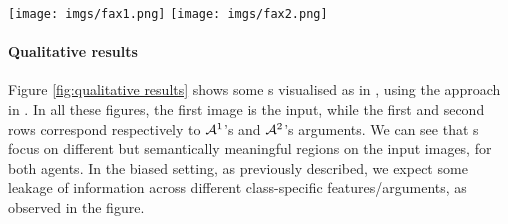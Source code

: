 \begin{figure*}
    \hfill
    \texttt{[image: imgs/fax1.png]} \hfill
    \texttt{[image: imgs/fax2.png]} \hfill
    \caption{Arguments %
    in \FAXIC s (%
    the proponent starts with the top left argument, the opponent follows with the argument below it, etc.), for classifiers trained on  FFHQ (left column) and AFHQ (right column)%
    , on fair (top row) and biased (bottom row) %
    settings. 
    }
    \label{fig:qualitative results}
    \vspace{-5pt}
\end{figure*}

\paragraph{Qualitative results}
Figure \ref{fig:qualitative results} shows some \FAXIC s visualised as in 
\cite{kori2022explaining}, using the approach in \cite{dissection}%
.
In all these figures, the first image is the input, while the first and second rows correspond respectively to $\mathcal{ A}^1$'s and $\mathcal{ A}^2$'s %
arguments. 
We can see that \FAXIC s %
focus on different but semantically meaningful regions on the input images, %
for both agents.
In the biased setting, as previously described, we expect some leakage of information across different class-specific features/arguments, as observed in 
the figure.

